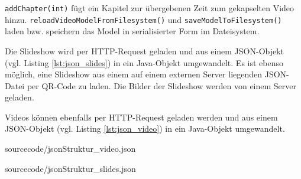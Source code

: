 \texttt{addChapter(int)} fügt ein Kapitel zur übergebenen Zeit zum gekapselten Video hinzu. 
\texttt{reloadVideoModelFromFilesystem()} und \texttt{saveModelToFilesystem()} laden bzw. speichern das Model in serialisierter Form im Dateisystem.

Die Slideshow wird per HTTP-Request geladen und aus einem JSON-Objekt (vgl. Listing \ref{lst:json_slides}) in ein Java-Objekt umgewandelt. Es ist ebenso möglich, eine Slideshow aus einem auf einem externen Server liegenden JSON-Datei per QR-Code zu laden. Die Bilder der Slideshow werden von einem Server geladen.

Videos können ebenfalls per HTTP-Request geladen werden und aus einem JSON-Objekt (vgl. Listing \ref{lst:json_video}) in ein Java-Objekt umgewandelt. 

\begin{minipage}{\linewidth}
\begin{lstinputlisting}[%
    caption={JSON-Struktur des Videos},%
    captionpos=b, %
    label={lst:json_video},%
    language=json,%
    firstnumber=1, %
    basicstyle=\scriptsize, %
    breaklines=true]
{sourcecode/jsonStruktur_video.json}
\end{lstinputlisting}
\end{minipage}
%
\begin{minipage}{\linewidth}
\begin{lstinputlisting}[%
    caption={JSON-Struktur der Slides},%
    captionpos=b, %
    label={lst:json_slides},%
    language=json,%
    firstnumber=1, %
    basicstyle=\scriptsize, %
    breaklines=true]
{sourcecode/jsonStruktur_slides.json}
\end{lstinputlisting}
\end{minipage}